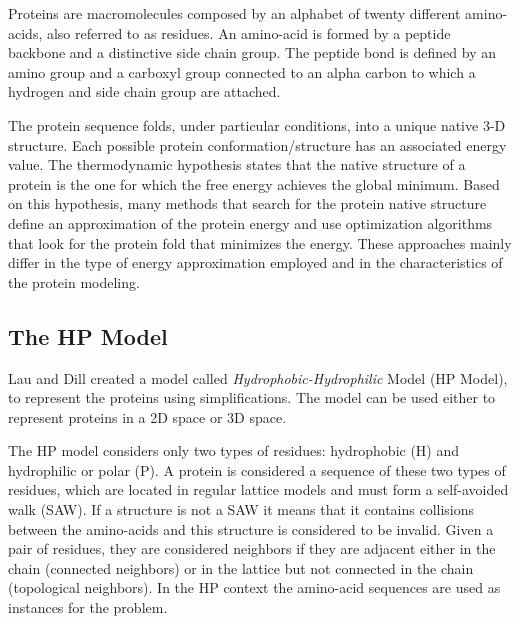 \documentclass[conference]{IEEEtran}
\begin{document}
Proteins are macromolecules composed by an alphabet of twenty different amino-acids, also referred to as residues. An amino-acid is formed by a peptide backbone and a distinctive side chain group. The peptide bond is defined by an amino group and a carboxyl group connected to an alpha carbon to which a hydrogen and side chain group are attached.




The protein sequence folds, under particular conditions, into a unique native 3-D structure. Each possible protein conformation/structure has an associated energy value. The thermodynamic hypothesis states that the native structure of a protein is the one for which the free energy achieves the global minimum. Based on this hypothesis, many methods \cite{custodio2004investigation, hsu2003growth, krasnogor2002multimeme, lin2011protein, unger1993genetic} that search for the protein native structure define an approximation of the protein energy and use optimization algorithms that look for the protein fold that minimizes the energy. These approaches mainly differ in the type of energy approximation employed and in the characteristics of the protein modeling.


\subsection{The HP Model} \label{sec:hpModel}


 Lau and Dill \cite{lau1989lattice} created a model called \textit{Hydrophobic-Hydrophilic} Model (HP Model), to represent the proteins using simplifications. The model can be used either to represent proteins in a 2D space or 3D space.

The HP model considers only two types of residues:  hydrophobic (H) and hydrophilic or polar (P). A protein is considered a sequence of these two types of residues, which are located in regular lattice models and must form a self-avoided walk (SAW). If a structure is not a SAW it means that it contains collisions between the amino-acids and this structure is considered to be invalid. Given a pair of residues, they are considered neighbors if they are adjacent  either in the chain (connected neighbors) or  in the lattice but not connected in the chain (topological neighbors). In the HP context the amino-acid sequences are used as instances for the problem.
\end{document}
